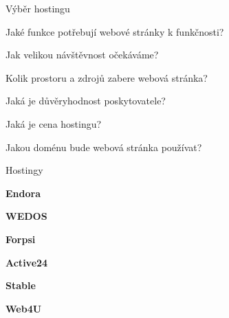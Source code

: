 \documentclass[aspectratio=169]{beamer}
\begin{document}
\begin{frame}{Výběr hostingu}
    \begin{cardTiny}
        \begin{flushleft}
            Jaké funkce potřebují webové stránky k funkčnosti?

            Jak velikou návštěvnost očekáváme?

            Kolik prostoru a zdrojů zabere webová stránka?

            Jaká je důvěryhodnost poskytovatele?

            Jaká je cena hostingu?

            Jakou doménu bude webová stránka používat?
        \end{flushleft}
    \end{cardTiny}
\end{frame}

\begin{frame}{Hostingy}
    \begin{multicols}{3}
        \centering

        \begin{cardTiny}
            \begin{center}
                \textbf{Endora}
            \end{center}
        \end{cardTiny}

        \begin{cardTiny}
            \begin{center}
                \textbf{WEDOS}
            \end{center}
        \end{cardTiny}

        \begin{cardTiny}
            \begin{center}
                \textbf{Forpsi}
            \end{center}
        \end{cardTiny}

        \begin{cardTiny}
            \begin{center}
                \textbf{Active24}
            \end{center}
        \end{cardTiny}

        \begin{cardTiny}
            \begin{center}
                \textbf{Stable}
            \end{center}
        \end{cardTiny}

        \begin{cardTiny}
            \begin{center}
                \textbf{Web4U}
            \end{center}
        \end{cardTiny}
    \end{multicols}
\end{frame}
\end{document}

